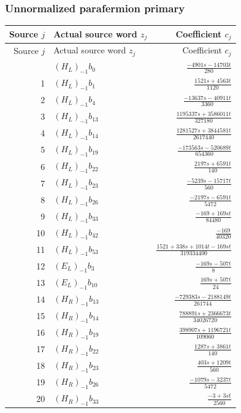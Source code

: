 \subsubsection{Unnormalized parafermion primary}
\begingroup\footnotesize\renewcommand{\arraystretch}{1.55}
\begin{longtable}{@{}rlr@{}}
\toprule Source $j$&Actual source word $z_j$&Coefficient $c_j$\\\midrule\endfirsthead
\toprule Source $j$&Actual source word $z_j$&Coefficient $c_j$\\\midrule\endhead
\bottomrule\endfoot
0 & $(H_L)_{-1}b_{0}$ & $\frac{-4901s-14703t}{280}$\\
1 & $(H_L)_{-1}b_{1}$ & $\frac{1521s+4563t}{1120}$\\
2 & $(H_L)_{-1}b_{4}$ & $\frac{-13637s-40911t}{3360}$\\
3 & $(H_L)_{-1}b_{13}$ & $\frac{1195337s+3586011t}{327180}$\\
4 & $(H_L)_{-1}b_{14}$ & $\frac{1281527s+3844581t}{2617440}$\\
5 & $(H_L)_{-1}b_{19}$ & $\frac{-173563s-520689t}{654360}$\\
6 & $(H_L)_{-1}b_{22}$ & $\frac{2197s+6591t}{140}$\\
7 & $(H_L)_{-1}b_{23}$ & $\frac{-5239s-15717t}{560}$\\
8 & $(H_L)_{-1}b_{26}$ & $\frac{-2197s-6591t}{5472}$\\
9 & $(H_L)_{-1}b_{33}$ & $\frac{-169+169st}{84480}$\\
10 & $(H_L)_{-1}b_{42}$ & $\frac{-169}{40320}$\\
11 & $(H_L)_{-1}b_{53}$ & $\frac{1521+338s+1014t-169st}{319334400}$\\
12 & $(E_L)_{-1}b_{3}$ & $\frac{-169s-507t}{8}$\\
13 & $(E_L)_{-1}b_{10}$ & $\frac{169s+507t}{24}$\\
14 & $(H_R)_{-1}b_{13}$ & $\frac{-729383s-2188149t}{261744}$\\
15 & $(H_R)_{-1}b_{14}$ & $\frac{788891s+2366673t}{34026720}$\\
16 & $(H_R)_{-1}b_{19}$ & $\frac{398907s+1196721t}{109060}$\\
17 & $(H_R)_{-1}b_{22}$ & $\frac{1287s+3861t}{140}$\\
18 & $(H_R)_{-1}b_{23}$ & $\frac{403s+1209t}{560}$\\
19 & $(H_R)_{-1}b_{26}$ & $\frac{-1079s-3237t}{5472}$\\
20 & $(H_R)_{-1}b_{33}$ & $\frac{-3+3st}{2560}$\\

\end{longtable}
